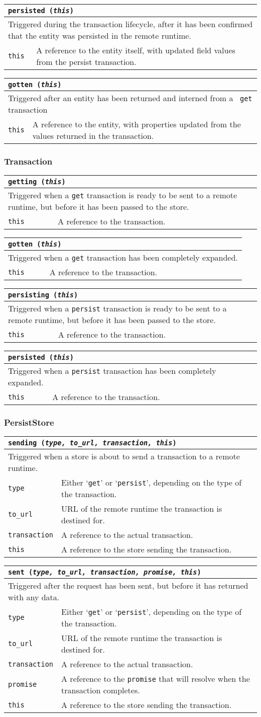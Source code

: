 \documentclass{article}
\newcommand{\ilcode}{\tt}
\newcommand{\method}[4]{
	\noindent
	\begin{tabular}{ | l | p{5in} | }
	\hline
	\multicolumn{2}{|l|}{\large \ilcode #1 ({\it #2})} \\
	\hline
	\multicolumn{2}{|p{6in}|}{#3} \\
	\hline
	#4
	\end{tabular}
}
\newcommand{\param}[2]{
	{\ilcode #1} & #2 \\
	\hline
}
\newcommand{\event}[4]{\method{#1}{#2}{#3}{#4}}
\begin{document}
\event{persisted}{this}
	{Triggered during the transaction lifecycle, after it has been confirmed
	that the entity was persisted in the remote runtime.}
	{\param{this}{A reference to the entity itself, with updated field values
	from the persist transaction.}}

\event{gotten}{this}
	{Triggered after an entity has been returned and interned from a {\ilcode
	get} transaction}
	{\param{this}{A reference to the entity, with properties updated from the
	values returned in the transaction.}}

\subsubsection{Transaction}
\event{getting}{this}
	{Triggered when a {\ilcode get} transaction is ready to be sent to a remote
	runtime, but before it has been passed to the store.}
	{\param{this}{A reference to the transaction.}}

\event{gotten}{this}
	{Triggered when a {\ilcode get} transaction has been completely expanded.}
	{\param{this}{A reference to the transaction.}}

\event{persisting}{this}
	{Triggered when a {\ilcode persist} transaction is ready to be sent to a
	remote runtime, but before it has been passed to the store.}
	{\param{this}{A reference to the transaction.}}

\event{persisted}{this}
	{Triggered when a {\ilcode persist} transaction has been completely
	expanded.}
	{\param{this}{A reference to the transaction.}}

\subsubsection{PersistStore}
\event{sending}{type, to\_url, transaction, this}
	{Triggered when a store is about to send a transaction to a remote runtime.}
	{
		\param{type}{Either `{\ilcode get}' or `{\ilcode persist}', depending on
			the type of the transaction.}
		\param{to\_url}{URL of the remote runtime the transaction is destined
			for.}
		\param{transaction}{A reference to the actual transaction.}
		\param{this}{A reference to the store sending the transaction.}
	}

\event{sent}{type, to\_url, transaction, promise, this}
	{Triggered after the request has been sent, but before it has returned with
		any data.}
	{
		\param{type}{Either `{\ilcode get}' or `{\ilcode persist}', depending on
			the type of the transaction.}
		\param{to\_url}{URL of the remote runtime the transaction is destined
			for.}
		\param{transaction}{A reference to the actual transaction.}
		\param{promise}{A reference to the {\ilcode promise} that will resolve when the
			transaction completes.}
		\param{this}{A reference to the store sending the transaction.}
	}
\end{document}
